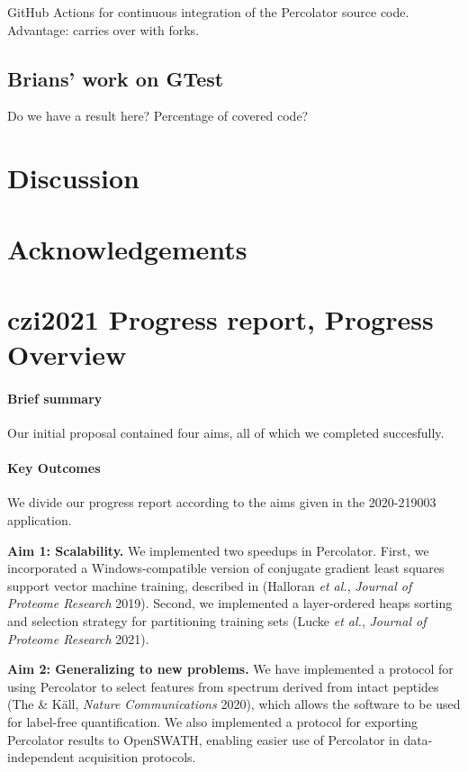 \documentclass{article}
\begin{document}
  GitHub Actions for continuous integration of the Percolator source code. Advantage: carries over with forks.

  \subsection*{Brians' work on GTest}
Do we have a result here? Percentage of covered code?


\section*{Discussion}


\section*{Acknowledgements}

\section*{czi2021 Progress report, Progress Overview}

\paragraph{Brief summary}

Our initial proposal contained four aims, all of which we completed
succesfully.

\paragraph{Key Outcomes}

We divide our progress report according to the aims given in the
2020-219003 application.


{\bf Aim 1: Scalability.} We implemented two speedups in Percolator.
First, we incorporated a Windows-compatible version of conjugate
gradient least squares support vector machine training, described in
(Halloran {\em et al.}, {\em Journal of Proteome Research} 2019).
Second, we implemented a layer-ordered heaps sorting and selection
strategy for partitioning training sets (Lucke {\em et al.}, {\em
  Journal of Proteome Research} 2021).

{\bf Aim 2: Generalizing to new problems.} We have implemented a
protocol for using Percolator to select features from spectrum derived
from intact peptides (The \& K\"{a}ll, {\em Nature Communications}
2020), which allows the software to be used for label-free
quantification. We also implemented a protocol for exporting
Percolator results to OpenSWATH, enabling easier use of Percolator in
data-independent acquisition protocols.
\end{document}
